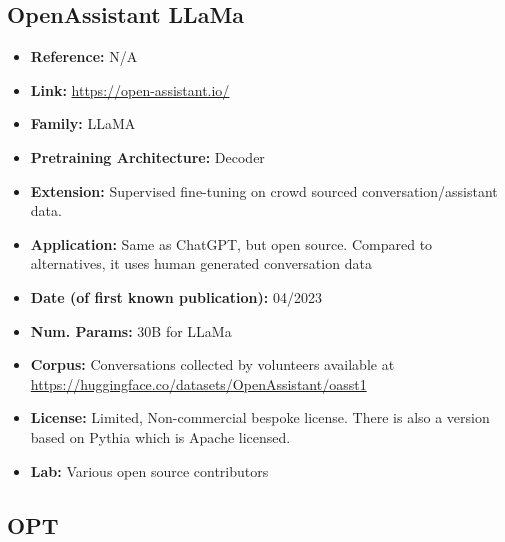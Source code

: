\documentclass{article}
\begin{document}
\subsection{OpenAssistant LLaMa}
            \begin{itemize}
                \item \textbf{Reference:} N/A
                \item \textbf{Link:} \url{https://open-assistant.io/}
                \item \textbf{Family:} LLaMA
                \item \textbf{Pretraining Architecture:} Decoder
                \item \textbf{Extension:} Supervised fine-tuning on crowd sourced conversation/assistant data.
                \item \textbf{Application:} Same as ChatGPT, but open source. Compared to alternatives, it uses human generated conversation data
                \item \textbf{Date (of first known publication):} 04/2023
                \item \textbf{Num. Params:} 30B for LLaMa
                \item \textbf{Corpus:} Conversations collected by volunteers  available at \url{https://huggingface.co/datasets/OpenAssistant/oasst1}
                \item \textbf{License:} Limited, Non-commercial bespoke license. There is also a version based on Pythia which is Apache licensed.
                \item \textbf{Lab:} Various open source contributors
            \end{itemize}
            
\subsection{OPT}
\end{document}
